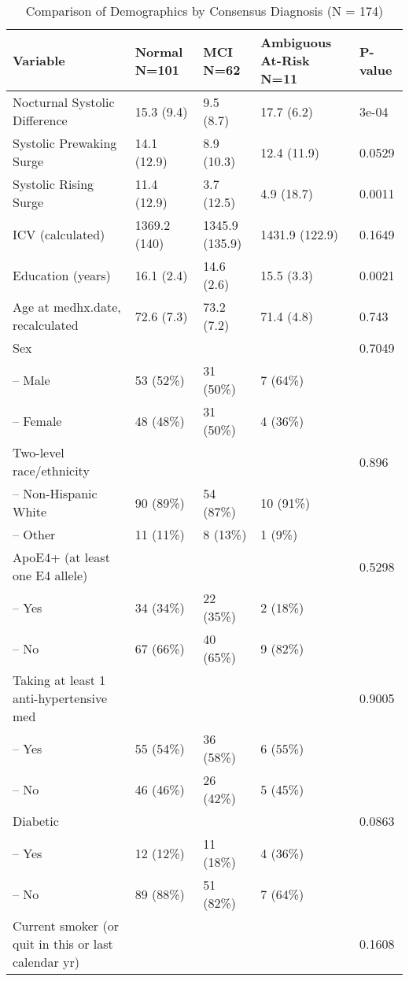\documentclass[10pt]{article}\usepackage[]{graphicx}\usepackage[]{color}
\begin{document}
\begin{table}[ht]
\centering
\caption{Comparison of Demographics by Consensus Diagnosis (N = 174)} 
\begin{tabular}{lllll}
  \toprule
Variable & \parbox{.5in}{Normal N=101} & \parbox{.41in}{MCI    N=62} & \parbox{.61in}{Ambiguous At-Risk      N=11} & P-value \\ 
  \midrule
Nocturnal Systolic Difference & 15.3 (9.4) & 9.5 (8.7) & 17.7 (6.2) & 3e-04 \\ 
  Systolic Prewaking Surge & 14.1 (12.9) & 8.9 (10.3) & 12.4 (11.9) & 0.0529 \\ 
  Systolic Rising Surge & 11.4 (12.9) & 3.7 (12.5) & 4.9 (18.7) & 0.0011 \\ 
  ICV (calculated) & 1369.2 (140) & 1345.9 (135.9) & 1431.9 (122.9) & 0.1649 \\ 
  Education (years) & 16.1 (2.4) & 14.6 (2.6) & 15.5 (3.3) & 0.0021 \\ 
  Age at medhx.date, recalculated & 72.6 (7.3) & 73.2 (7.2) & 71.4 (4.8) & 0.743 \\ 
  Sex &  &  &  & 0.7049 \\ 
  -- Male & 53 (52\%) & 31 (50\%) & 7 (64\%) &  \\ 
  -- Female & 48 (48\%) & 31 (50\%) & 4 (36\%) &  \\ 
  Two-level race/ethnicity &  &  &  & 0.896 \\ 
  -- Non-Hispanic White & 90 (89\%) & 54 (87\%) & 10 (91\%) &  \\ 
  -- Other & 11 (11\%) & 8 (13\%) & 1 (9\%) &  \\ 
  ApoE4+ (at least one E4 allele) &  &  &  & 0.5298 \\ 
  -- Yes & 34 (34\%) & 22 (35\%) & 2 (18\%) &  \\ 
  -- No & 67 (66\%) & 40 (65\%) & 9 (82\%) &  \\ 
  Taking at least 1 anti-hypertensive med &  &  &  & 0.9005 \\ 
  -- Yes & 55 (54\%) & 36 (58\%) & 6 (55\%) &  \\ 
  -- No & 46 (46\%) & 26 (42\%) & 5 (45\%) &  \\ 
  Diabetic &  &  &  & 0.0863 \\ 
  -- Yes & 12 (12\%) & 11 (18\%) & 4 (36\%) &  \\ 
  -- No & 89 (88\%) & 51 (82\%) & 7 (64\%) &  \\ 
  Current smoker (or quit in this or last calendar yr) &  &  &  & 0.1608 \\ 

\end{tabular}
\end{table}
\end{document}

